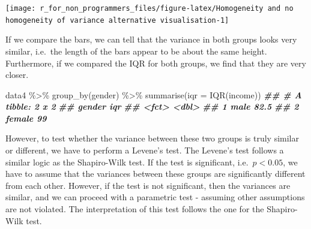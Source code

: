 \documentclass[
]{book}
\newenvironment{Shaded}{\begin{snugshade}}{\end{snugshade}}
\newcommand{\AttributeTok}[1]{\textcolor[rgb]{0.77,0.63,0.00}{#1}}
\newcommand{\DocumentationTok}[1]{\textcolor[rgb]{0.56,0.35,0.01}{\textbf{\textit{#1}}}}
\newcommand{\FunctionTok}[1]{\textcolor[rgb]{0.00,0.00,0.00}{#1}}
\newcommand{\NormalTok}[1]{#1}
\newcommand{\SpecialCharTok}[1]{\textcolor[rgb]{0.00,0.00,0.00}{#1}}
\begin{document}
\begin{center}\texttt{[image: r\_for\_non\_programmers\_files/figure-latex/Homogeneity and no homogeneity of variance alternative visualisation-1]} \end{center}

If we compare the bars, we can tell that the variance in both groups looks very similar, i.e.~the length of the bars appear to be about the same height. Furthermore, if we compared the IQR for both groups, we find that they are very closer.

\begin{Shaded}
\begin{Highlighting}[]
\NormalTok{data4 }\SpecialCharTok{\%\textgreater{}\%}
  \FunctionTok{group\_by}\NormalTok{(gender) }\SpecialCharTok{\%\textgreater{}\%}
  \FunctionTok{summarise}\NormalTok{(}\AttributeTok{iqr =} \FunctionTok{IQR}\NormalTok{(income))}
\DocumentationTok{\#\# \# A tibble: 2 x 2}
\DocumentationTok{\#\#   gender   iqr}
\DocumentationTok{\#\#   \textless{}fct\textgreater{}  \textless{}dbl\textgreater{}}
\DocumentationTok{\#\# 1 male    82.5}
\DocumentationTok{\#\# 2 female  99}
\end{Highlighting}
\end{Shaded}

However, to test whether the variance between these two groups is truly similar or different, we have to perform a Levene's test. The Levene's test follows a similar logic as the Shapiro-Wilk test. If the test is significant, i.e.~\(p < 0.05\), we have to assume that the variances between these groups are significantly different from each other. However, if the test is not significant, then the variances are similar, and we can proceed with a parametric test - assuming other assumptions are not violated. The interpretation of this test follows the one for the Shapiro-Wilk test.

\begin{Shaded}
\end{Shaded}
\end{document}
